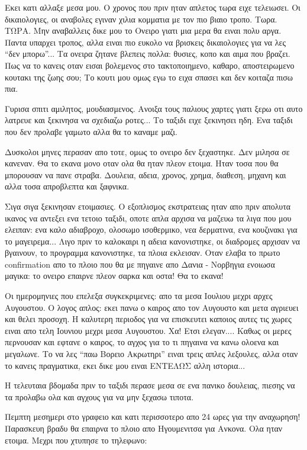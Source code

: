 \documentclass[11pt, letterpaper]{book}
\begin{document}
Εκει κατι αλλαξε μεσα μου. Ο χρονος που πριν ηταν απλετος τωρα ειχε τελειωσει. Οι δικαιολογιες, οι αναβολες εγιναν χιλια κομματια με τον πιο βιαιο τροπο. Τωρα. ΤΩΡΑ.
Μην αναβαλλεις δικε μου το Ονειρο γιατι μια μερα θα ειναι πολυ αργα. Παντα υπαρχει τροπος, αλλα ειναι πιο ευκολο να βρισκεις δικαιολογιες για να λες ``δεν μπορω''... Τα ονειρα ζητανε βλεπεις πολλα: θυσιες, κοπο και αιμα που βραζει. Πως να το κανεις οταν εισαι βολεμενος στο τακτοποιημενο, καθαρο, αποστειρωμενο κουτακι της ζωης σου; Το κουτι μου ομως εγω το ειχα σπασει και δεν κοιταζα πισω πια.

Γυρισα σπιτι αμιλητος, μουδιασμενος. Ανοιξα τους παλιους χαρτες γιατι ξερω οτι αυτο λατρευε και ξεκινησα να σχεδιαζω ροτες... Το ταξιδι ειχε ξεκινησει ηδη. Ενα ταξιδι που δεν προλαβε γαμωτο αλλα θα το καναμε μαζι.

Δυσκολοι μηνες περασαν απο τοτε, ομως το ονειρο δεν ξεχαστηκε. Δεν μιλησα σε κανεναν. Θα το εκανα μονο οταν ολα θα ηταν πλεον ετοιμα. Ηταν τοσα που θα μπορουσαν να πανε στραβα. Δουλεια, αδεια, χρονος, χρημα, διαθεση, μηχανη και αλλα τοσα απροβλεπτα και ξαφνικα.

Σιγα σιγα ξεκινησαν ετοιμασιες. Ο εξοπλισμος εκστρατειας ηταν απο πριν απολυτα ικανος να αντεξει ενα τετοιο ταξιδι, οποτε απλα αρχισα να μαζευω τα λιγα που μου ελειπαν: ενα καλο αδιαβροχο, ολοσωμο ισοθερμικο, νεα δερματινα, ενα κουζινακι για το μαγειρεμα... Λιγο πριν το καλοκαιρι η αδεια κανονιστηκε, οι διαδρομες αρχισαν να βγαινουν, το προγραμμα κανονιστηκε, τα πλοια εκλεισαν. Οταν ελαβα το πρωτο confirmation απο το πλοιο που θα με πηγαινε απο Δανια - Νορβηγια ενοιωσα μαγικα: το ονειρο επαιρνε πλεον σαρκα και οστα! Θα το εκανα!

Οι ημερομηνιες που επελεξα συγκεκριμενες: απο τα μεσα Ιουλιου μεχρι αρχες Αυγουστου. Ο λογος απλος: εκει πανω ο καιρος απο τον Αυγουστο και μετα αγριευει και θελει προσοχη. Η καλυτερη περιοδος για να επισκευτει καποιος αυτες τις χωρες ειναι απο τελη Ιουνιου μεχρι μεσα Αυγουστου. Χα! Ετσι ελεγαν.... Καθως οι μερες περνουσαν και εφτανε ο καιρος, το αγχος για το τι πηγαινα να κανω ολοενα και μεγαλωνε. Το να λες ``παω Βορειο Ακρωτηρι'' ειναι τρεις απλες λεξουλες, αλλα οταν το κανεις πραγματικα, εκει δικε μου ειναι ΕΝΤΕΛΩΣ αλλη ιστορια...

Η τελευταια βδομαδα πριν το ταξιδι περασε μεσα σε ενα πανικο δουλειας, πιεσης να τα προλαβω ολα και αγχους για να μην ξεχασω τιποτα.

Πεμπτη μεσημερι στο γραφειο και κατι περισσοτερο απο 24 ωρες για την αναχωρηση! Παρασκευη βραδυ θα επαιρνα το πλοιο απο Ηγουμενιτσα για Ανκονα. Ολα ηταν ετοιμα. Μεχρι που χτυπησε το τηλεφωνο:\\
\end{document}
